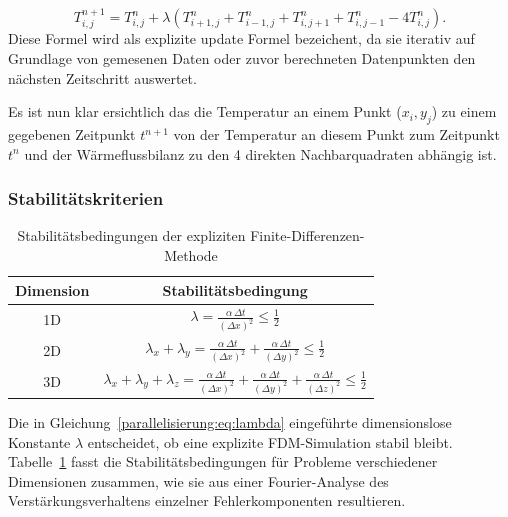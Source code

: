 \begin{equation}
	\label{parallelisierung:eq:update_formel}
	T_{i,j}^{n+1}
	=
	T_{i,j}^n +
	\lambda \left(
	T_{i+1,j}^n + T_{i-1,j}^n + T_{i,j+1}^n + T_{i,j-1}^n - 4 T_{i,j}^n
	\right).
\end{equation}
Diese Formel wird als explizite update Formel bezeichent, da sie iterativ auf Grundlage von gemesenen Daten oder zuvor berechneten Datenpunkten den nächsten Zeitschritt auswertet.

Es ist nun klar ersichtlich das die Temperatur an einem Punkt (\(x_i, y_j\)) zu einem gegebenen Zeitpunkt \(t^{n+1}\)  von der Temperatur an diesem Punkt zum Zeitpunkt \(t^n\) und der Wärmeflussbilanz zu den 4 direkten Nachbarquadraten abhängig ist.

\subsubsection{Stabilitätskriterien}
\label{parallelisierung:sec:stabilitaetskriterien}

\begin{table}
	\centering
	\caption{Stabilitätsbedingungen der expliziten Finite-Differenzen-Methode}
	\label{parallelisierung:tab:stabilitaet_fdm}
	\begin{tabular}{|c|c|}
		\hline
		\textbf{Dimension} & \textbf{Stabilitätsbedingung} \\
		\hline
		1D & 
		\( \displaystyle \lambda = \frac{\alpha \, \Delta t}{(\Delta x)^2} \leq \frac{1}{2} \) \\
		\hline
		2D & 
		\( \displaystyle \lambda_x + \lambda_y =
		\frac{\alpha \, \Delta t}{(\Delta x)^2} +
		\frac{\alpha \, \Delta t}{(\Delta y)^2} \leq \frac{1}{2} \) \\
		\hline
		3D & 
		\( \displaystyle \lambda_x + \lambda_y + \lambda_z =
		\frac{\alpha \, \Delta t}{(\Delta x)^2} +
		\frac{\alpha \, \Delta t}{(\Delta y)^2} +
		\frac{\alpha \, \Delta t}{(\Delta z)^2} \leq \frac{1}{2} \) \\
		\hline
	\end{tabular}
\end{table}

Die in Gleichung~\ref{parallelisierung:eq:lambda} eingeführte dimensionslose Konstante \(\lambda\) entscheidet, ob eine explizite FDM-Simulation stabil bleibt.  
Tabelle~\ref{parallelisierung:tab:stabilitaet_fdm} fasst die Stabilitätsbedingungen für Probleme verschiedener Dimensionen zusammen, wie sie aus einer Fourier-Analyse des Verstärkungsverhaltens einzelner Fehlerkomponenten resultieren.

